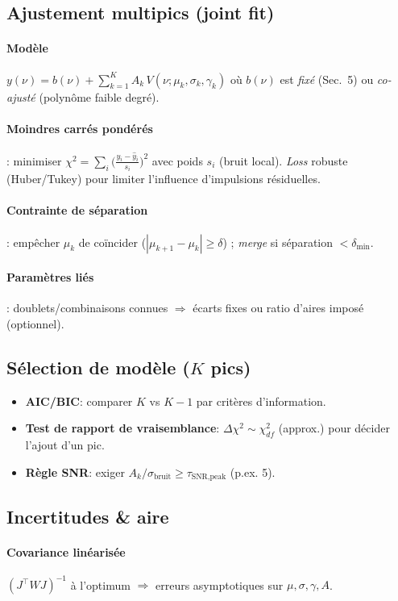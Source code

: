 \subsection{Ajustement multipics (joint fit)}
\paragraph{Modèle} $y(\nu)=b(\nu)+\sum_{k=1}^{K} A_k\,V(\nu;\mu_k,\sigma_k,\gamma_k)$ où $b(\nu)$ est \emph{fixé} (Sec.~5) ou \emph{co-ajusté} (polynôme faible degré). 
\paragraph{Moindres carrés pondérés}: minimiser $\chi^2=\sum_i \big(\frac{y_i-\hat{y}_i}{s_i}\big)^2$ avec poids $s_i$ (bruit local). \emph{Loss} robuste (Huber/Tukey) pour limiter l'influence d'impulsions résiduelles.
\paragraph{Contrainte de séparation}: empêcher $\mu_{k}$ de coïncider ($|\mu_{k+1}-\mu_k|\ge \delta$) ; \emph{merge} si séparation $<\delta_{\min}$.
\paragraph{Paramètres liés}: doublets/combinaisons connues $\Rightarrow$ écarts fixes ou ratio d'aires imposé (optionnel).

\subsection{Sélection de modèle ($K$ pics)}
\begin{itemize}[nosep]
\item \textbf{AIC/BIC}: comparer $K$ vs $K\!-\!1$ par critères d'information.
\item \textbf{Test de rapport de vraisemblance}: $\Delta\chi^2 \sim \chi^2_{df}$ (approx.) pour décider l'ajout d'un pic.
\item \textbf{Règle SNR}: exiger $A_k/\sigma_{\text{bruit}} \ge \tau_{\text{SNR,peak}}$ (p.ex. 5).
\end{itemize}

\subsection{Incertitudes \& aire}
\paragraph{Covariance linéarisée} $(J^\top W J)^{-1}$ à l'optimum $\Rightarrow$ erreurs asymptotiques sur $\mu,\sigma,\gamma,A$.
